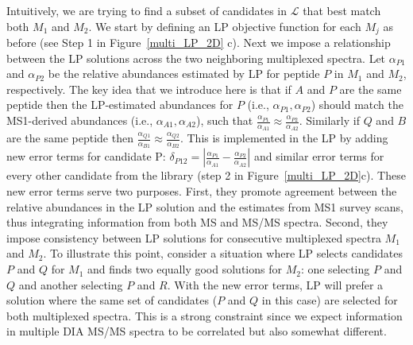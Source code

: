 \documentclass[arial,11pt]{article}
\begin{document}
Intuitively, we are trying to find a subset of candidates in $\mathcal{L}$ that best match both $M_{1}$ and $M_{2}$.  We start by defining an LP objective function for each $M_{j}$ as before (see Step 1 in Figure~\ref{multi_LP_2D} c).  Next we impose a relationship between the LP solutions across the two neighboring multiplexed spectra.  %
Let $\alpha_{P1}$ and $\alpha_{P2}$ be the relative abundances estimated by LP for peptide $P$ in $M_{1}$ and $M_{2}$, respectively. The key idea that we introduce here is that if $A$ and $P$ are the same peptide then the LP-estimated abundances for $P$ (i.e., $\alpha_{P1}, \alpha_{P2}$) should match the MS1-derived abundances (i.e., $\alpha_{A1}, \alpha_{A2}$), such that $\frac{\alpha_{P1}}{\alpha_{A1}} \approx \frac{\alpha_{P2}}{\alpha_{A2}}$.
Similarly if $Q$ and $B$ are the same peptide then $\frac{\alpha_{Q1}}{\alpha_{B1}} \approx \frac{\alpha_{Q2}}{\alpha_{B2}}$. This is implemented in the LP by adding new error terms for candidate P: $\delta_{P12} = |\frac{\alpha_{P1}}{\alpha_{A1}} - \frac{\alpha_{P2}}{\alpha_{A2}}|$ and similar error terms for every other candidate from the library (step 2 in Figure~\ref{multi_LP_2D}c).
%
These new error terms serve two purposes. First, they promote agreement between the relative abundances in the LP solution and the estimates from MS1 survey scans, thus integrating information from both MS and MS/MS spectra. Second, they impose consistency between LP solutions for consecutive multiplexed spectra $M_{1}$ and $M_{2}$.
%
To illustrate this point, consider a situation where LP selects candidates $P$ and $Q$ for $M_{1}$ and finds two equally good solutions for $M_{2}$: one selecting $P$ and $Q$ and another selecting $P$ and $R$. With the new error terms, LP will prefer a solution where the same set of candidates ($P$ and $Q$ in this case) are selected for both multiplexed spectra.
This is a strong constraint since we expect information in multiple DIA MS/MS spectra to be correlated but also somewhat different.
\end{document}
